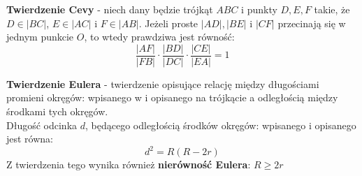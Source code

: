 \documentclass[14pt,a4paper]{extarticle}
\begin{document}
\hfill\break
\noindent \textbf{Twierdzenie Cevy} - niech dany będzie trójkąt $ABC$ i punkty $D, E, F$ takie, że
$D \in \vert BC\vert$, $E \in \vert AC\vert$ i $F \in \vert AB\vert$. Jeżeli proste $\vert AD\vert, \vert BE\vert$ i
$\vert CF\vert$ przecinają się w jednym punkcie $O$, to wtedy prawdziwa jest równość:
$$\dfrac{\vert AF\vert}{\vert FB\vert} \cdot \dfrac{\vert BD\vert}{\vert DC\vert} \cdot \dfrac{\vert CE\vert}{\vert EA\vert} = 1$$
\MoveBelowBox\unskip
\hfill\break

\hfill\break
\noindent \textbf{Twierdzenie Eulera} - twierdzenie opisujące relację między długościami promieni
okręgów: wpisanego w i opisanego na trójkącie a odległością między środkami tych okręgów.\\
Długość odcinka $d$, będącego odległością środków okręgów: wpisanego i opisanego jest równa:
$$d^{2} = R(R-2r)$$
Z twierdzenia tego wynika również \textbf{nierówność Eulera}: $R \geq 2r$
\MoveBelowBox\unskip
\hfill\break
\end{document}

